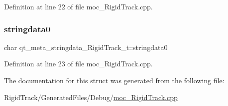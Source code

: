 Definition at line 22 of file moc\+\_\+\+Rigid\+Track.\+cpp.

\mbox{\label{structqt__meta__stringdata___rigid_track__t_adbbd4919c3447a71740e7dbb4e92814e}} 
\subsubsection{\texorpdfstring{stringdata0}{stringdata0}}
{\footnotesize\ttfamily char qt\+\_\+meta\+\_\+stringdata\+\_\+\+Rigid\+Track\+\_\+t\+::stringdata0}



Definition at line 23 of file moc\+\_\+\+Rigid\+Track.\+cpp.



The documentation for this struct was generated from the following file\+:\begin{DoxyCompactItemize}
\item 
Rigid\+Track/\+Generated\+Files/\+Debug/\hyperlink{_debug_2moc___rigid_track_8cpp}{moc\+\_\+\+Rigid\+Track.\+cpp}\end{DoxyCompactItemize}
